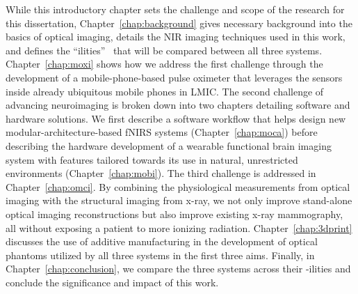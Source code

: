 While this introductory chapter sets the challenge and scope of the research for this dissertation, Chapter~\ref{chap:background} gives necessary background into the basics of optical imaging, details the \ac{NIR} imaging techniques used in this work, and defines the ``ilities''~\cite{DeWeck2012} that will be compared between all three systems. Chapter~\ref{chap:moxi} shows how we address the first challenge through the development of a mobile-phone-based pulse oximeter that leverages the sensors inside already ubiquitous mobile phones in \ac{LMIC}. The second challenge of advancing neuroimaging is broken down into two chapters detailing software and hardware solutions. We first describe a software workflow that helps design new modular-architecture-based \ac{fNIRS} systems (Chapter~\ref{chap:moca}) before describing the hardware development of a wearable functional brain imaging system with features tailored towards its use in natural, unrestricted environments (Chapter~\ref{chap:mobi}). The third challenge is addressed in Chapter~\ref{chap:omci}. By combining the physiological measurements from optical imaging with the structural imaging from x-ray, we not only improve stand-alone optical imaging reconstructions but also improve existing x-ray mammography, all without exposing a patient to more ionizing radiation. Chapter~\ref{chap:3dprint} discusses the use of additive manufacturing in the development of optical phantoms utilized by all three systems in the first three aims. Finally, in Chapter~\ref{chap:conclusion}, we compare the three systems across their -ilities and conclude the significance and impact of this work.


